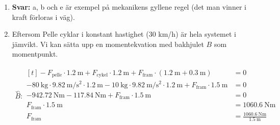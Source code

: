 \documentclass[11pt]{article}
\begin{document}
\begin{enumerate}[itemsep=2em]
              \textbf{Svar:} Pelle måste dra i repet med en kraft på \SI{245.5}{\newton}.
              \newpage
        \item
              \textbf{Svar: } a, b och e är exempel på mekanikens gyllene regel (det man vinner i kraft förloras i väg).

        \item
              Eftersom Pelle cyklar i konstant hastighet (30 km/h) är hela systemet i jämvikt. Vi kan sätta upp en momentekvation med bakhjulet $B$ som momentpunkt.

              \begin{align*}
                      \overset{\curvearrowleft}{B} : \begin{aligned}[t]
                                                             -F_{\text{pelle}} \cdot \SI{1.2}{\meter} + F_{\text{cykel}} \cdot \SI{1.2}{\meter} + F_{\text{fram}} \cdot (\SI{1.2}{\meter} + \SI{0.3}{\meter})                                                                  & = 0                                                   \\
                                                             -\SI{80}{\kilo\gram} \cdot \SI{9.82}{\meter/\second\squared} \cdot \SI{1.2}{\meter} - \SI{10}{\kilo\gram} \cdot \SI{9.82}{\meter/\second\squared} \cdot \SI{1.2}{\meter} + F_{\text{fram}} \cdot \SI{1.5}{\meter} & = 0                                                   \\
                                                             \SI{-942.72}{\newton\meter} - \SI{117.84}{\newton\meter} + F_{\text{fram}} \cdot \SI{1.5}{\meter}                                                                                                                 & = 0                                                   \\
                                                             F_{\text{fram}} \cdot \SI{1.5}{\meter}                                                                                                                                                                            & = \SI{1060.6}{\newton\meter}                          \\
                                                             F_{\text{fram}}                                                                                                                                                                                                   & = \frac{\SI{1060.6}{\newton\meter}}{\SI{1.5}{\meter}} \\

\end{aligned}
\end{align*}
\end{enumerate}
\end{document}
